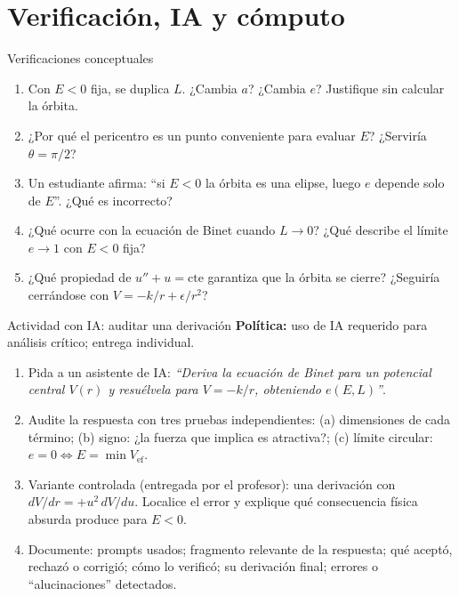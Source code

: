 \documentclass[spanish]{beamer}
\newcommand{\Vef}{V_{\mathrm{ef}}}
\begin{document}
\section{Verificación, IA y cómputo}
\begin{frame}{Verificaciones conceptuales}
\begin{enumerate}
\item<1-> Con $E<0$ fija, se duplica $L$. ¿Cambia $a$? ¿Cambia $e$? Justifique sin calcular la órbita.
\item<2-> ¿Por qué el pericentro es un punto conveniente para evaluar $E$? ¿Serviría $\theta=\pi/2$?
\item<3-> Un estudiante afirma: ``si $E<0$ la órbita es una elipse, luego $e$ depende solo de $E$''. ¿Qué es incorrecto?
\item<4-> ¿Qué ocurre con la ecuación de Binet cuando $L\to0$? ¿Qué describe el límite $e\to1$ con $E<0$ fija?
\item<5-> ¿Qué propiedad de $u''+u=\text{cte}$ garantiza que la órbita se cierre? ¿Seguiría cerrándose con $V=-k/r+\epsilon/r^2$?
\end{enumerate}
\end{frame}

\begin{frame}{Actividad con IA: auditar una derivación}
\small
\textbf{Política:} uso de IA \alert{requerido} para análisis crítico; entrega individual.
\begin{enumerate}
\item<1-> Pida a un asistente de IA: \emph{``Deriva la ecuación de Binet para un potencial central $V(r)$ y resuélvela para $V=-k/r$, obteniendo $e(E,L)$''}.
\item<2-> Audite la respuesta con tres pruebas independientes:
  (a) dimensiones de cada término; (b) signo: ¿la fuerza que implica es atractiva?;
  (c) límite circular: $e=0 \Leftrightarrow E=\min\Vef$.
\item<3-> Variante controlada (entregada por el profesor): una derivación con
  $dV/dr=+u^2\,dV/du$. Localice el error y explique qué consecuencia física absurda produce para $E<0$.
\item<4-> Documente: prompts usados; fragmento relevante de la respuesta; qué aceptó, rechazó o corrigió; cómo lo verificó; su derivación final; errores o ``alucinaciones'' detectados.
\end{enumerate}
\end{frame}
\end{document}
